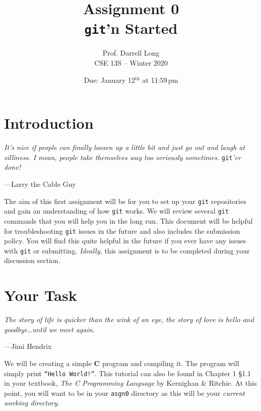 \documentclass[11pt]{article}
\title{Assignment 0 \\ \texttt{git}'n Started}
\author{Prof. Darrell Long \\ CSE 13S -- Winter 2020}
\date{Due: January  12$^\text{th}$ at 11:59\,pm}
\newcommand\asgn[0]{asgn0}
\begin{document}
\maketitle

\section{Introduction}
\textwidth
\epigraph{\emph{It's nice if people can finally loosen up a little bit
and just go out and laugh at silliness. I mean, people take themselves
way too seriously sometimes.}  \texttt{git}\emph{'er done!}}{---Larry the
Cable Guy}

\noindent The aim of this first assignment will be for you to set up your
\texttt{git} repositories and gain an understanding of how \texttt{git}
works. We will review several \texttt{git} commands that you will
help you in the long run. This document will be helpful for
troubleshooting \texttt{git} issues in the future and also includes
the submission policy. You will find this quite helpful in the future if you ever
have any issues with \texttt{git} or submitting.
\emph{Ideally,} this assignment
is to be completed during your discussion section.


\section{Your Task}
\epigraph{\emph{The story of life is quicker than the wink of an eye, the
story of love is hello and goodbye\ldots until we meet again.}}{---Jimi Hendrix}

\noindent We will be creating a simple \textbf{C} program and
compiling it.  The program will simply
print \texttt{``Hello World!''}. This tutorial can also
be found in Chapter 1 \S 1.1 in your textbook, \textit{The C
Programming Language} by Kernighan \& Ritchie. At this point, you
will want to be in your \texttt{\asgn} directory as this will
be your \emph{current working directory}.
\end{document}
